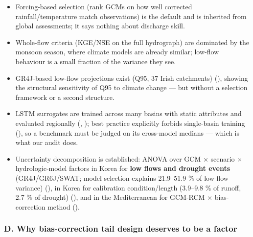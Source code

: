 \documentclass[
  english,
  11pt,
]{article}
\providecommand{\tightlist}{%
  \setlength{\itemsep}{0pt}\setlength{\parskip}{0pt}}
\begin{document}
\begin{itemize}
\tightlist
\item
  Forcing-based selection (rank GCMs on how well corrected
  rainfall/temperature match observations) is the default and is
  inherited from global assessments; it says nothing about discharge
  skill.
\item
  Whole-flow criteria (KGE/NSE on the full hydrograph) are dominated by
  the monsoon season, where climate models are already similar; low-flow
  behaviour is a small fraction of the variance they see.
\item
  GR4J-based low-flow projections exist (Q95, 37 Irish catchments)
  (), showing the
  structural sensitivity of Q95 to climate change --- but without a
  selection framework or a second structure.
\item
  LSTM surrogates are trained across many basins with static attributes
  and evaluated regionally (, ); best practice
  explicitly forbids single-basin training
  (), so a
  benchmark must be judged on its cross-model medians --- which is what
  our audit does.
\item
  Uncertainty decomposition is established: ANOVA over GCM × scenario ×
  hydrologic-model factors in Korea for \textbf{low flows and drought
  events} (GR4J/GR6J/SWAT; model selection explains 21.9--51.9 \% of
  low-flow variance) (), in
  Korea for calibration condition/length (3.9--9.8 \% of runoff, 2.7 \%
  of drought) (), and
  in the Mediterranean for GCM-RCM × bias-correction method
  ().
\end{itemize}

\subsubsection{D. Why bias-correction tail design deserves to be a
factor}\label{d.-why-bias-correction-tail-design-deserves-to-be-a-factor}
\end{document}
